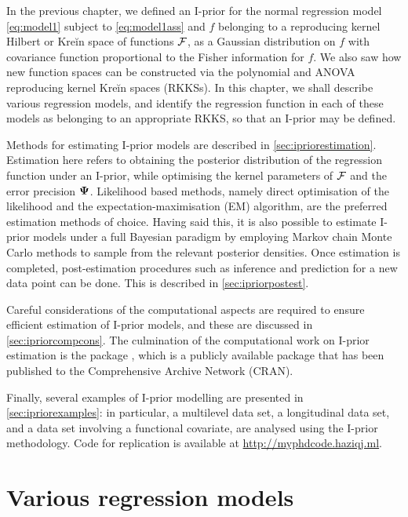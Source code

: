 \documentclass[showframe,11pt,twoside,openright]{report}
\begin{document}
\label{chapter4}
\thispagestyle{chapterfour}

In the previous chapter, we defined an I-prior for the normal regression model \cref{eq:model1} subject to \cref{eq:model1ass} and $f$ belonging to a reproducing kernel Hilbert or Kreĭn space of functions ${\mathcal F}$, as a Gaussian distribution on $f$ with covariance function proportional to the Fisher information for $f$.
We also saw how new function spaces can be constructed via the polynomial and ANOVA reproducing kernel Kreĭn spaces (RKKSs).
In this chapter, we shall describe various regression models, and identify the regression function in each of these models as belonging to an appropriate RKKS, so that an I-prior may be defined.

Methods for estimating I-prior models are described in \cref{sec:ipriorestimation}.
Estimation here refers to obtaining the posterior distribution of the regression function under an I-prior, while optimising the kernel parameters of ${\mathcal F}$ and the error precision ${\bm\Psi}$.
Likelihood based methods, namely direct optimisation of the likelihood and the expectation-maximisation (EM) algorithm, are the preferred estimation methods of choice.
Having said this, it is also possible to estimate I-prior models under a full Bayesian paradigm by employing Markov chain Monte Carlo methods to sample from the relevant posterior densities.
Once estimation is completed, post-estimation procedures such as inference and prediction for a new data point can be done.
This is described in \cref{sec:ipriorpostest}.

Careful considerations of the computational aspects are required to ensure efficient estimation of I-prior models, and these are discussed in \cref{sec:ipriorcompcons}.
The culmination of the computational work on I-prior estimation is the  package \citep{jamil2017iprior}, which is a publicly available  package that has been published to the Comprehensive  Archive Network (CRAN).

Finally, several examples of I-prior modelling are presented in  \cref{sec:ipriorexamples}: in particular, a multilevel data set, a longitudinal data set, and a data set involving a functional covariate, are analysed using the I-prior methodology.
Code for replication is available at \url{http://myphdcode.haziqj.ml}.

\section{Various regression models}
\label{sec:various-regression}

\end{document}
